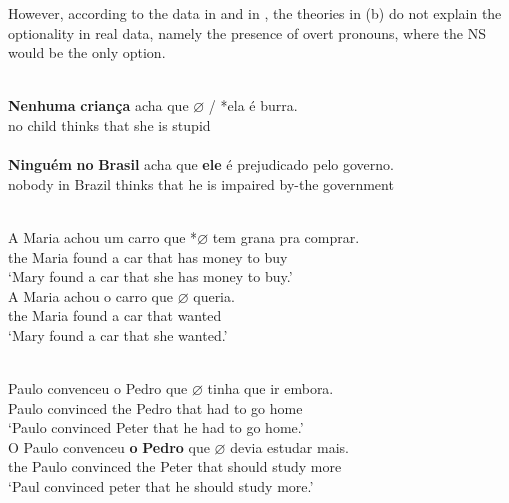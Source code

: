 \documentclass[output=paper]{langsci/langscibook}
\begin{document}
However, according to the data in \textcite{BarbosaDuarteKato2005} and in
\citet{Kato2009}, the theories in (b) do not explain the optionality in real
data, namely the presence of overt pronouns, where the NS would be the only
option.

\ea\label{ex:key:26.22}
    \ea \textcite{NegraoMuller1996}\\
    \gll    \textbf{Nenhuma} \textbf{criança} acha que \textbf{$\varnothing$} / *ela é burra.\\
            no child     thinks that {} {} \hphantom{(}she is stupid\\
    \ex \textcite{BarbosaDuarteKato2005}\\
    \gll    \textbf{Ninguém} \textbf{no} \textbf{Brasil} acha    que \textbf{ele}\textbf{} é prejudicado pelo governo.\\
            nobody    in Brazil   thinks  that he is  impaired     by-the government\\
    \z
\z

\ea%
    \label{ex:key:26.23}
    \ea     \textcite{FigueiredoSilva2000}\\
	\gll	A Maria achou um carro que *\textbf{$\varnothing$} tem grana pra comprar. \\
			the Maria  found   a   car     that  {} has money  to buy\\
	\glt	\enquote*{Mary found  a car that she has money to buy.}
    \ex     \textcite{Kato2009}\\
	\gll	A Maria achou o carro que \textbf{$\varnothing$} queria.\\
			the Maria    found  a car     that {} wanted\\
	\glt	\enquote*{Mary found a car that she wanted.}
    \z
\z

\ea%
    \label{ex:key:26.24}
    \ea     \textcite{Modesto2000}\\
	\gll	Paulo convenceu o Pedro que  \textbf{$\varnothing$} tinha que ir embora.\\
            Paulo  convinced the Pedro that {} had to go home\\
	\glt	\enquote*{Paulo convinced Peter that he had to go home.}\newpage
    \ex     \textcite{Kato2009}\\
    \gll	O Paulo convenceu \textbf{o} \textbf{Pedro}\textbf{} que \textbf{$\varnothing$}\textbf{} devia estudar mais.\\
			the Paulo convinced the Peter that {} should study more\\
	\glt	\enquote*{Paul convinced peter that he should study more.}
    \z
\z
\end{document}
